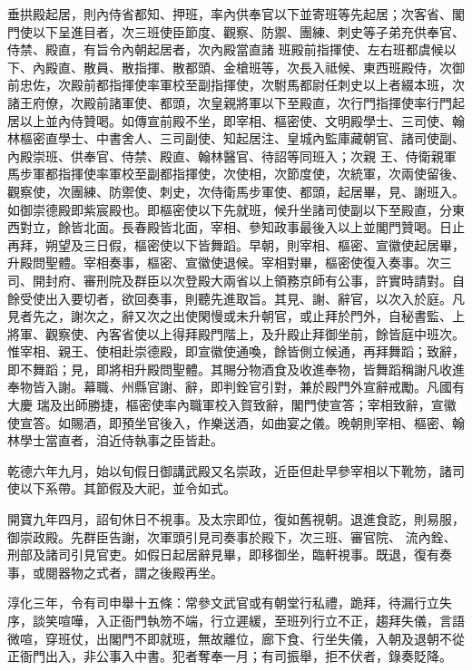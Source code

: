 \begin{pinyinscope}
 垂拱殿起居，則內侍省都知、押班，率內供奉官以下並寄班等先起居；次客省、閣門使以下呈進目者，次三班使臣節度、觀察、防禦、團練、刺史等子弟充供奉官、侍禁、殿直，有旨令內朝起居者，次內殿當直諸
 班殿前指揮使、左右班都虞候以下、內殿直、散員、散指揮、散都頭、金槍班等，次長入祗候、東西班殿侍，次御前忠佐，次殿前都指揮使率軍校至副指揮使，次駙馬都尉任刺史以上者綴本班，次諸王府僚，次殿前諸軍使、都頭，次皇親將軍以下至殿直，次行門指揮使率行門起居以上並內侍贊喝。如傳宣前殿不坐，即宰相、樞密使、文明殿學士、三司使、翰林樞密直學士、中書舍人、三司副使、知起居注、皇城內監庫藏朝官、諸司使副、內殿崇班、供奉官、侍禁、殿直、翰林醫官、待詔等同班入；次親
 王、侍衛親軍馬步軍都指揮使率軍校至副都指揮使，次使相，次節度使，次統軍，次兩使留後、觀察使，次團練、防禦使、刺史，次侍衛馬步軍使、都頭，起居畢，見、謝班入。如御崇德殿即紫宸殿也。即樞密使以下先就班，候升坐諸司使副以下至殿直，分東西對立，餘皆北面。長春殿皆北面，宰相、參知政事最後入以上並閣門贊喝。日止再拜，朔望及三日假，樞密使以下皆舞蹈。早朝，則宰相、樞密、宣徽使起居畢，升殿問聖體。宰相奏事，樞密、宣徽使退候。宰相對畢，樞密使復入奏事。次三
 司、開封府、審刑院及群臣以次登殿大兩省以上領務京師有公事，許實時請對。自餘受使出入要切者，欲回奏事，則聽先進取旨。其見、謝、辭官，以次入於庭。凡見者先之，謝次之，辭又次之出使閑慢或未升朝官，或止拜於門外，自秘書監、上將軍、觀察使、內客省使以上得拜殿門階上，及升殿止拜御坐前，餘皆庭中班次。惟宰相、親王、使相赴崇德殿，即宣徽使通喚，餘皆側立候通，再拜舞蹈；致辭，即不舞蹈；見，即將相升殿問聖體。其賜分物酒食及收進奉物，皆舞蹈稱謝凡收進奉物皆入謝。幕職、州縣官謝、辭，即判銓官引對，兼於殿門外宣辭戒勵。凡國有大慶
 瑞及出師勝捷，樞密使率內職軍校入賀致辭，閣門使宣答；宰相致辭，宣徽使宣答。如賜酒，即預坐官後入，作樂送酒，如曲宴之儀。晚朝則宰相、樞密、翰林學士當直者，洎近侍執事之臣皆赴。



 乾德六年九月，始以旬假日御講武殿又名崇政，近臣但赴早參宰相以下靴笏，諸司使以下系帶。其節假及大祀，並令如式。



 開寶九年四月，詔旬休日不視事。及太宗即位，復如舊視朝。退進食訖，則易服，御崇政殿。先群臣告謝，次軍頭引見司奏事於殿下，次三班、審官院、
 流內銓、刑部及諸司引見官吏。如假日起居辭見畢，即移御坐，臨軒視事。既退，復有奏事，或閱器物之式者，謂之後殿再坐。



 淳化三年，令有司申舉十五條：常參文武官或有朝堂行私禮，跪拜，待漏行立失序，談笑喧嘩，入正衙門執笏不端，行立遲緩，至班列行立不正，趨拜失儀，言語微喧，穿班仗，出閣門不即就班，無故離位，廊下食、行坐失儀，入朝及退朝不從正衙門出入，非公事入中書。犯者奪奉一月；有司振舉，拒不伏者，錄奏貶降。




\end{pinyinscope}
